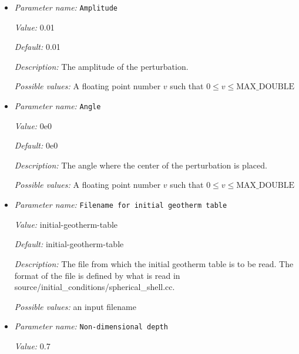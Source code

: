 \begin{itemize}
\item {\it Parameter name:} {\tt Amplitude}
\label{parameters:Initial temperature model/Spherical gaussian perturbation/Amplitude}


{\it Value:} 0.01


{\it Default:} 0.01


{\it Description:} The amplitude of the perturbation.


{\it Possible values:} A floating point number $v$ such that $0 \leq v \leq \text{MAX\_DOUBLE}$
\item {\it Parameter name:} {\tt Angle}
\label{parameters:Initial temperature model/Spherical gaussian perturbation/Angle}


{\it Value:} 0e0


{\it Default:} 0e0


{\it Description:} The angle where the center of the perturbation is placed.


{\it Possible values:} A floating point number $v$ such that $0 \leq v \leq \text{MAX\_DOUBLE}$
\item {\it Parameter name:} {\tt Filename for initial geotherm table}
\label{parameters:Initial temperature model/Spherical gaussian perturbation/Filename for initial geotherm table}


{\it Value:} initial-geotherm-table


{\it Default:} initial-geotherm-table


{\it Description:} The file from which the initial geotherm table is to be read. The format of the file is defined by what is read in source/initial\_conditions/spherical\_shell.cc.


{\it Possible values:} an input filename
\item {\it Parameter name:} {\tt Non-dimensional depth}
\label{parameters:Initial temperature model/Spherical gaussian perturbation/Non-dimensional depth}


{\it Value:} 0.7



\end{itemize}
